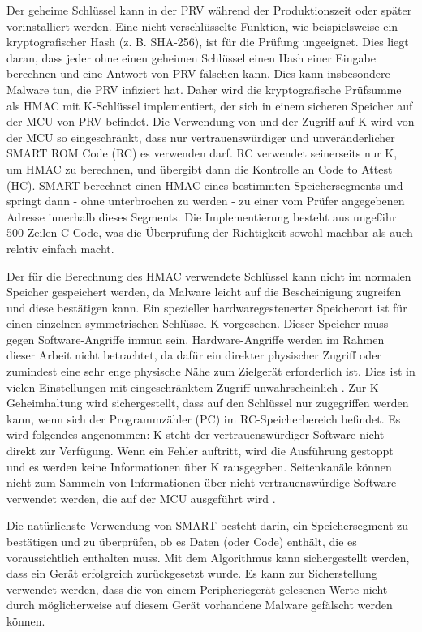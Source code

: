 Der geheime Schlüssel kann in der PRV während der Produktionszeit oder später vorinstalliert werden. Eine nicht verschlüsselte Funktion, wie beispielsweise ein kryptografischer Hash (z. B. SHA-256), ist für die Prüfung ungeeignet. Dies liegt daran, dass jeder ohne einen geheimen Schlüssel einen Hash einer Eingabe berechnen und eine Antwort von PRV fälschen kann. Dies kann insbesondere Malware tun, die PRV infiziert hat. Daher wird die kryptografische Prüfsumme als HMAC mit K-Schlüssel implementiert, der sich in einem sicheren Speicher auf der MCU von PRV befindet. Die Verwendung von und der Zugriff auf K wird von der MCU so eingeschränkt, dass nur vertrauenswürdiger und unveränderlicher SMART ROM Code (RC) es verwenden darf. RC verwendet seinerseits nur K, um HMAC zu berechnen, und übergibt dann die Kontrolle an Code to Attest (HC). SMART berechnet einen HMAC eines bestimmten Speichersegments und springt dann - ohne unterbrochen zu werden - zu einer vom Prüfer angegebenen Adresse innerhalb dieses Segments. Die Implementierung besteht aus ungefähr 500 Zeilen C-Code, was die Überprüfung der Richtigkeit sowohl machbar als auch relativ einfach macht.\cite[p.4]{website:smart} 

Der für die Berechnung des HMAC verwendete Schlüssel kann nicht im normalen Speicher gespeichert werden, da Malware leicht auf die Bescheinigung zugreifen und diese bestätigen kann. Ein spezieller hardwaregesteuerter Speicherort ist für einen einzelnen symmetrischen Schlüssel K vorgesehen. Dieser Speicher muss gegen Software-Angriffe immun sein. Hardware-Angriffe werden im Rahmen dieser Arbeit nicht betrachtet, da dafür ein direkter physischer Zugriff oder zumindest eine sehr enge physische Nähe zum Zielgerät erforderlich ist. Dies ist in vielen Einstellungen mit eingeschränktem Zugriff unwahrscheinlich \cite[p.6]{website:smart}. Zur K-Geheimhaltung wird sichergestellt, dass auf den Schlüssel nur zugegriffen werden kann, wenn sich der Programmzähler (PC) im RC-Speicherbereich befindet. Es wird folgendes angenommen: K steht der vertrauenswürdiger Software nicht direkt zur Verfügung. Wenn ein Fehler auftritt, wird die Ausführung gestoppt und es werden keine Informationen über K rausgegeben. Seitenkanäle können nicht zum Sammeln von Informationen über nicht vertrauenswürdige Software verwendet werden, die auf der MCU ausgeführt wird \cite[p.8]{website:smart}. 

Die natürlichste Verwendung von SMART besteht darin, ein Speichersegment zu bestätigen und zu überprüfen, ob es Daten (oder Code) enthält, die es voraussichtlich enthalten muss. Mit dem Algorithmus kann sichergestellt werden, dass ein Gerät erfolgreich zurückgesetzt wurde. Es kann zur Sicherstellung verwendet werden, dass die von einem Peripheriegerät gelesenen Werte nicht durch möglicherweise auf diesem Gerät vorhandene Malware gefälscht werden können.

